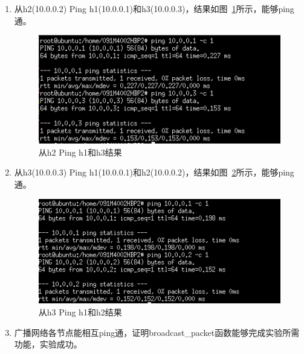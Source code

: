 \documentclass{zjureport}
\begin{document}
\begin{enumerate}
          \item 从h2(10.0.0.2) Ping h1(10.0.0.1)和h3(10.0.0.3)，结果如图~\ref{fig:06}所示，能够ping通。
            \begin{figure}[!htbp]
              \centering
              \includegraphics[width=0.7\linewidth]{figures/06.jpg}
              \caption{从h2 Ping h1和h3结果}
              \label{fig:06}
            \end{figure}

            \item 从h3(10.0.0.3) Ping h1(10.0.0.1)和h2(10.0.0.2)，结果如图~\ref{fig:07}所示，能够ping通。
              \begin{figure}[!htbp]
                \centering
                \includegraphics[width=0.7\linewidth]{figures/07.jpg}
                \caption{从h3 Ping h1和h2结果}
                \label{fig:07}
              \end{figure}

          \item 广播网络各节点能相互ping通，证明broadcast\_packet函数能够完成实验所需功能，实验成功。

      \end{enumerate}
\end{document}
